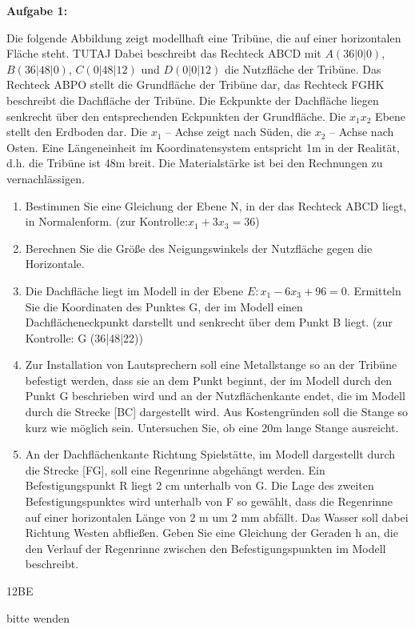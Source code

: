 \documentclass[a4paper,12pt]{article}
\newcommand{\Aufgabe}[1]{
  {
  \vspace*{0.5cm}
  \textsf{\textbf{Aufgabe #1}}
  \vspace*{0.2cm}
  
  }
}
\begin{document}
\Aufgabe{1:}
Die folgende Abbildung zeigt modellhaft eine Tribüne, die auf einer horizontalen Fläche steht. TUTAJ
Dabei beschreibt das Rechteck ABCD mit
  $A (36|0|0)$, $ B (36|48|0)$, $C (0|48|12)$ und $ D (0|0|12) $
die Nutzfläche der Tribüne. Das Rechteck ABPO stellt die Grundfläche der Tribüne dar, das
Rechteck FGHK beschreibt die Dachfläche der Tribüne. Die Eckpunkte der Dachfläche liegen
senkrecht über den entsprechenden Eckpunkten der Grundfläche.
Die $x_1x_2 $  Ebene stellt den Erdboden dar. Die $ x_1$ – Achse zeigt nach Süden, die $x_2$ – Achse nach
Osten. Eine Längeneinheit im Koordinatensystem entspricht 1m in der Realität, d.h. die Tribüne ist
48m breit. Die Materialstärke ist bei den Rechnungen zu vernachlässigen.
\begin{enumerate}[label={\alph*)}]
\item  Bestimmen Sie eine Gleichung der Ebene N, in der das Rechteck ABCD liegt, in
Normalenform. (zur Kontrolle:$ x_1 + 3x_3 = 36 $)
\item Berechnen Sie die Größe des Neigungswinkels der Nutzfläche gegen die Horizontale.
\item Die Dachfläche liegt im Modell in der Ebene $E: x_1 - 6x_3 + 96 = 0.$
Ermitteln Sie die Koordinaten des Punktes G, der im Modell einen Dachflächeneckpunkt
darstellt und senkrecht über dem Punkt B liegt. (zur Kontrolle: G (36|48|22))
\item Zur Installation von Lautsprechern soll eine Metallstange so an der Tribüne befestigt
werden, dass sie an dem Punkt beginnt, der im Modell durch den Punkt G beschrieben wird
und an der Nutzflächenkante endet, die im Modell durch die Strecke [BC] dargestellt wird.
Aus Kostengründen soll die Stange so kurz wie möglich sein. Untersuchen Sie, ob eine 20m
lange Stange ausreicht.
\item An der Dachflächenkante Richtung Spielstätte, im Modell dargestellt durch die Strecke
[FG], soll eine Regenrinne abgehängt werden. Ein Befestigungspunkt R liegt 2 cm
unterhalb von G. Die Lage des zweiten Befestigungspunktes wird unterhalb von F so
gewählt, dass die Regenrinne auf einer horizontalen Länge von 2 m um 2 mm abfällt. Das
Wasser soll dabei Richtung Westen abfließen. Geben Sie eine Gleichung der Geraden h an,
die den Verlauf der Regenrinne zwischen den Befestigungspunkten im Modell beschreibt.
\end{enumerate}


\begin{flushright}12BE \end{flushright}
\begin{flushright}bitte wenden \end{flushright}
\end{document}

